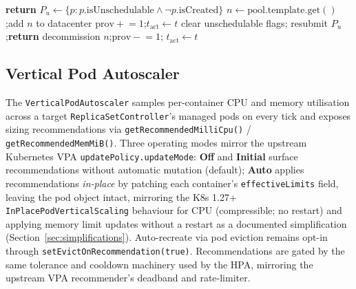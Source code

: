 \documentclass[ASNA,twocolumn]{USG}
\begin{document}
    \begin{algorithm}[t]
\caption{Cluster Autoscaler Reconciliation}\label{alg:ca}
\begin{algorithmic}[1]
         \State \textbf{return} \EndIf
        \State $P_u \leftarrow \{p : p.\mathrm{isUnschedulable} \wedge \neg p.\mathrm{isCreated}\}$
            \State $n \leftarrow \mathrm{pool.template.get()}$;\quad add $n$ to datacenter
            \State $\mathrm{prov} \mathrel{+}= 1$;\quad $t_{\mathrm{act}} \leftarrow t$
            \State clear unschedulable flags; resubmit $P_u$;\quad\textbf{return}
        \EndIf
                    \State decommission $n$;\quad $\mathrm{prov} \mathrel{-}= 1$;\quad
                    $t_{\mathrm{act}} \leftarrow t$
                \EndIf
            \EndIf
        \EndFor
    \EndProcedure
\end{algorithmic}
    \end{algorithm}

    \subsection{Vertical Pod Autoscaler}\label{sec:vpa}

    The \texttt{VerticalPodAutoscaler} samples per-container CPU and memory
    utilisation across a target \texttt{ReplicaSetController}'s managed
    pods on every tick and exposes sizing recommendations via
    \texttt{getRecommendedMilliCpu()} / \texttt{getRecommendedMemMiB()}.
    Three operating modes mirror the upstream Kubernetes VPA
    \texttt{updatePolicy.updateMode}: \textbf{Off} and \textbf{Initial}
    surface recommendations without automatic mutation (default);
    \textbf{Auto} applies recommendations \emph{in-place} by patching each
    container's \texttt{effectiveLimits} field, leaving the pod object
    intact, mirroring the K8s 1.27+ \texttt{InPlacePodVerticalScaling}
    behaviour for CPU (compressible; no restart) and applying memory limit
    updates without a restart as a documented simplification
    (Section~\ref{sec:simplifications}). Auto-recreate via pod eviction
    remains opt-in through \texttt{setEvictOnRecommendation(true)}.
    Recommendations are gated by the same tolerance and cooldown machinery
    used by the HPA, mirroring the upstream VPA recommender's deadband and
    rate-limiter.
\end{document}
